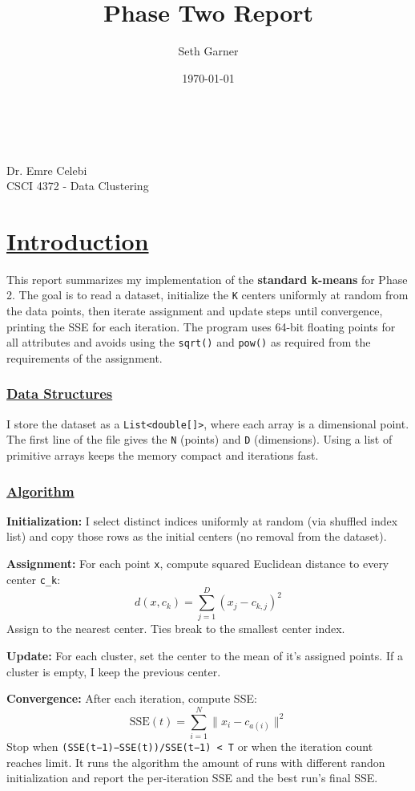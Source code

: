 \documentclass[12pt]{article}
\author{Seth Garner}
\date{\today}
\title{Phase Two Report}
\renewcommand{\maketitle}{%
\begin{center}
\Large\thetitle\\[1ex]
\normalsize\theauthor\\
Dr. Emre Celebi\\
CSCI 4372 - Data Clustering\\
\thedate
\end{center}
}
\begin{document}
\maketitle
\section*{\underline{Introduction}}
\label{sec:orgd05f2fb}
This report summarizes my implementation of the \textbf{standard k-means} for Phase 2. The goal is to read a dataset, initialize the \texttt{K} centers uniformly at random from the data points, then iterate assignment and update steps until convergence, printing the SSE for each iteration. The program uses 64-bit floating points for all attributes and avoids using the \texttt{sqrt()} and \texttt{pow()} as required from the requirements of the assignment.
\subsubsection*{\underline{Data Structures}}
\label{sec:org97a5e45}
I store the dataset as a \texttt{List<double[]>}, where each array is a dimensional point. The first line of the file gives the \texttt{N} (points) and \texttt{D} (dimensions). Using a list of primitive arrays keeps the memory compact and iterations fast.
\subsubsection*{\underline{Algorithm}}
\label{sec:orgd71b746}
\textbf{\textbf{Initialization:}} I select distinct indices uniformly at random (via shuffled index list) and copy those rows as the initial centers (no removal from the dataset).

\textbf{\textbf{Assignment:}} For each point \texttt{x}, compute squared Euclidean distance to every center \texttt{c\_k}:
\[
d(x,c_k)=\sum_{j=1}^{D}(x_j-c_{k,j})^2
\]
Assign to the nearest center. Ties break to the smallest center index.

\textbf{\textbf{Update:}} For each cluster, set the center to the mean of it's assigned points. If a cluster is empty, I keep the previous center.

\textbf{\textbf{Convergence:}} After each iteration, compute SSE:
\[
\text{SSE}(t)=\sum_{i=1}^{N} \lVert x_i - c_{a(i)} \rVert^2
\]
Stop when \texttt{(SSE(t−1)−SSE(t))/SSE(t−1) < T} or when the iteration count reaches limit. It runs the algorithm the amount of runs with different randon initialization and report the per-iteration SSE and the best run's final SSE.
\end{document}
